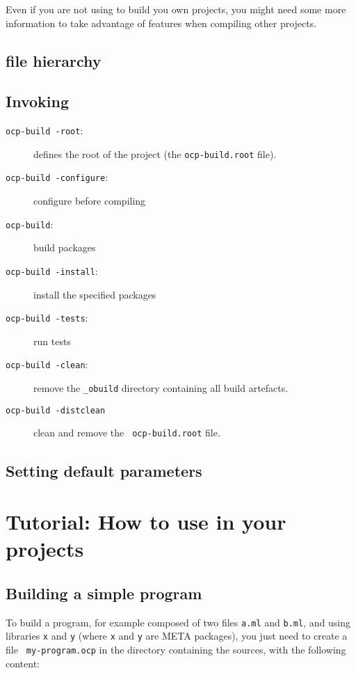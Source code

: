 Even if you are not using \ocpbuild{} to build you own projects, you
might need some more information to take advantage of \ocpbuild{}
features when compiling other projects.

\section{\ocpbuild{} file hierarchy}

\section{Invoking \ocpbuild{}}

\begin{description}
\item[{\tt ocp-build -root}:] defines the root of the project (the
  {\tt ocp-build.root} file).
\item[{\tt ocp-build -configure}:] configure before compiling
\item[{\tt ocp-build}:] build packages
\item[{\tt ocp-build -install}:] install the specified packages
\item[{\tt ocp-build -tests}:] run tests
\item[{\tt ocp-build -clean}:] remove the {\tt \_obuild} directory
  containing all build artefacts.
\item[{\tt ocp-build -distclean}] clean and remove the {\tt
  ocp-build.root} file.
\end{description}

\section{Setting \ocpbuild{} default parameters}

\chapter{Tutorial: How to use \ocpbuild{} in your projects}

\section{Building a simple program}

To build a program, for example composed of two files {\tt a.ml} and
{\tt b.ml}, and using libraries {\tt x} and {\tt y} (where {\tt x} and
{\tt y} are META packages), you just need to create a file {\tt
  my-program.ocp} in the directory containing the sources, with the
following content:


